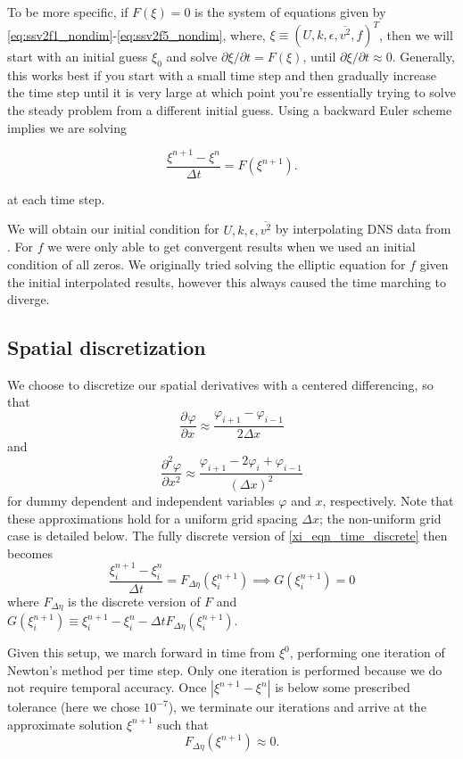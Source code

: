 \documentclass[a4paper,11pt]{article}
\newcommand{\pderiv}[3][]{%
  \ensuremath{\frac{\partial^{#1} {#2}}{\partial {#3}^{#1}}}}
\newcommand{\noi}{\noindent}
\newcommand{\ep}{\epsilon}
\begin{document}
To be more specific, if $F(\xi) = 0$ is the system of equations given by
\eqref{eq:ssv2f1_nondim}-\eqref{eq:ssv2f5_nondim}, where, $\xi \equiv (U, k,
\ep, \overline{v^2}, f)^T$, then we will start with an initial guess $\xi_0$ and
solve $\partial \xi / \partial t = F(\xi)$, until $\partial \xi / \partial t
\approx 0$. Generally, this works best if you start with a small
time step and then gradually increase the time step until it is very large at
which point you're essentially trying to solve the steady problem from a
different initial guess. Using a backward Euler scheme implies we are solving 

\begin{equation}\label{xi_eqn_time_discrete}
\frac{\xi^{n+1} - \xi^n}{\Delta t} = F(\xi^{n+1}).
\end{equation}

\noi at each time step. 

We will obtain our initial condition for $U, k, \ep,
\overline{v^2}$ by interpolating DNS data from \cite{Lee}. For $f$ we were only
able to get convergent results when we used an initial condition of all zeros.
We originally tried solving the elliptic equation for $f$ given the initial
interpolated results, however this always caused the time marching to diverge.
\subsection{Spatial discretization}
We choose to discretize our spatial derivatives with a centered differencing, so that 
\[
\pderiv{\varphi}{x} \approx \frac{\varphi_{i+1}-\varphi_{i-1}}{2\Delta x} 
\]
and 
\[
\frac{\partial^2 \varphi}{\partial x^2} \approx \frac{ \varphi_{i+1} - 2\varphi_i + \varphi_{i-1} }{(\Delta x)^2} 
\]
for dummy dependent and independent variables $\varphi$ and $x$, respectively. Note that these approximations hold for a uniform grid spacing $\Delta x$; the non-uniform grid case is detailed below. The fully discrete version of \eqref{xi_eqn_time_discrete} then becomes 
\begin{equation}\label{xi_eqn_fully_discrete}
\frac{\xi_i^{n+1} - \xi_i^n}{\Delta t} = F_{\Delta \eta}(\xi_i^{n+1}) \implies G(\xi^{n+1}_i) = 0 
\end{equation}
where $F_{\Delta \eta}$ is the discrete version of $F$ and $G(\xi_i^{n+1}) \equiv \xi^{n+1}_i - \xi^n_i - \Delta t F_{\Delta \eta}(\xi_i^{n+1})$. 

Given this setup, we march forward in time from $\xi^0$, performing one
iteration of Newton's method per time step. Only one iteration is performed
because we do not require temporal accuracy. Once $|\xi^{n+1}-\xi^n|$ is below
some prescribed tolerance (here we chose $10^{-7}$), we terminate our iterations
and arrive at the approximate solution $\xi^{n+1}$ such that
\[
F_{\Delta \eta}(\xi^{n+1}) \approx 0 .
\]
\end{document}
